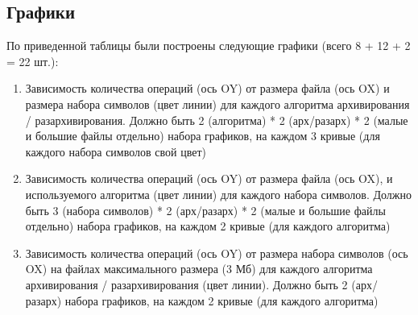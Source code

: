 \documentclass[russian, a4paper, 12pt]{article}
\begin{document}
\subsection{Графики}
По приведенной таблицы были построены следующие графики (всего 8 + 12 + 2 = 22 шт.):
\begin{enumerate}
  \item Зависимость количества операций (ось OY) от размера файла (ось OX) и размера
        набора символов (цвет линии) для каждого алгоритма архивирования /
        разархивирования. Должно быть 2 (алгоритма) * 2 (арх/разарх) * 2 (малые и
        большие файлы отдельно) набора графиков, на каждом 3 кривые (для каждого
        набора символов свой цвет)
\item Зависимость количества операций (ось OY) от размера файла (ось OX), и
      используемого алгоритма (цвет линии) для каждого набора символов. Должно
      быть 3 (набора символов) * 2 (арх/разарх) * 2 (малые и большие файлы
      отдельно) набора графиков, на каждом 2 кривые (для каждого алгоритма)
\item Зависимость количества операций (ось OY) от размера набора символов (ось OX)
      на файлах максимального размера (3 Мб) для каждого алгоритма архивирования
      / разархивирования (цвет линии). Должно быть 2 (арх/разарх) набора графиков,
      на каждом 2 кривые (для каждого алгоритма)
\end{enumerate}
\end{document}
